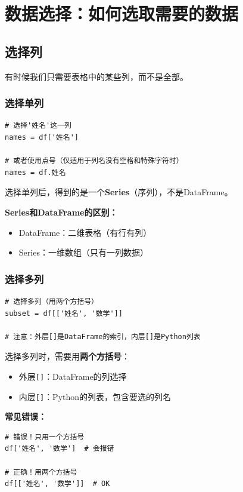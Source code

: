 \documentclass[12pt,a4paper]{article}
\begin{document}
\section{数据选择：如何选取需要的数据}

\subsection{选择列}

有时候我们只需要表格中的某些列，而不是全部。

\subsubsection{选择单列}

\begin{lstlisting}[caption={选择单列}]
# 选择'姓名'这一列
names = df['姓名']

# 或者使用点号（仅适用于列名没有空格和特殊字符时）
names = df.姓名
\end{lstlisting}

\begin{knowledgebox}
选择单列后，得到的是一个\textbf{Series}（序列），不是DataFrame。

\textbf{Series和DataFrame的区别：}
\begin{itemize}
    \item DataFrame：二维表格（有行有列）
    \item Series：一维数组（只有一列数据）
\end{itemize}
\end{knowledgebox}

\subsubsection{选择多列}

\begin{lstlisting}[caption={选择多列}]
# 选择多列（用两个方括号）
subset = df[['姓名', '数学']]

# 注意：外层[]是DataFrame的索引，内层[]是Python列表
\end{lstlisting}

\begin{tipbox}[注意双括号]
选择多列时，需要用\textbf{两个方括号}：
\begin{itemize}
    \item 外层\texttt{[]}：DataFrame的列选择
    \item 内层\texttt{[]}：Python的列表，包含要选的列名
\end{itemize}

\textbf{常见错误：}
\begin{lstlisting}
# 错误！只用一个方括号
df['姓名', '数学']  # 会报错

# 正确！用两个方括号
df[['姓名', '数学']]  # OK
\end{lstlisting}
\end{tipbox}
\end{document}
